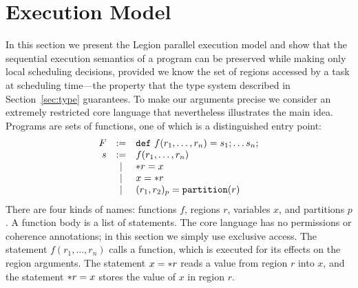 
\section{Execution Model}
\label{sec:exec}


In this section we present the Legion parallel execution model and
show that the sequential execution semantics of a program can be
preserved while making only local scheduling decisions, provided we
know the set of regions accessed by a task at scheduling time---the
property that the type system described in Section~\ref{sec:type}
guarantees.
To make our arguments precise we consider an extremely restricted core language
that nevertheless illustrates the main idea.
Programs are sets of functions, one of which is a distinguished entry point:
{ \small
\[
\begin{array}{rcl}
F & := & \mbox{\tt def}\ f(r_1,\ldots,r_n) =   s_1; \ldots s_n; \\
s & := & f(r_1,\ldots,r_n) \\
&| & \ast r = x \\
& | & x = \ast r \\
&| & (r_1, r_2)_{p} = \mbox{\tt partition}(r)
\end{array}
\]
}
There are four kinds of names: functions $f$, regions $r$, 
variables $x$, and partitions $p$.  A function body is a list of statements.
The core language has no permissions or coherence annotations;
in this section we simply use exclusive access.
The statement $f(r_1,\ldots,r_n)$ calls a function, which
is executed for its effects on the region arguments.  The statement $x
= \ast r$ reads a value from region $r$ into
$x$, and the statement $\ast r = x$ stores the value of $x$
in region $r$.  

